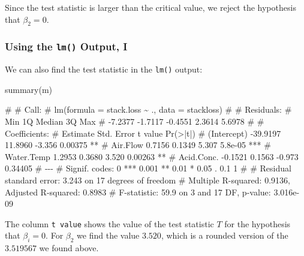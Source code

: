 \documentclass[
  a4paper,
]{article}
\newenvironment{Shaded}{\begin{snugshade}}{\end{snugshade}}
\newcommand{\FunctionTok}[1]{\textcolor[rgb]{0.00,0.00,0.00}{#1}}
\newcommand{\NormalTok}[1]{#1}
\theoremstyle{definition}
\theoremstyle{definition}
\theoremstyle{definition}
\theoremstyle{definition}
\theoremstyle{remark}
\begin{document}
Since the test statistic is larger than the critical value,
we reject the hypothesis that \(\beta_2 = 0\).

\hypertarget{using-the-lm-output-i}{%
\subsubsection{\texorpdfstring{Using the \texttt{lm()} Output, I}{Using the lm() Output, I}}\label{using-the-lm-output-i}}

We can also find the test statistic in the \texttt{lm()} output:

\begin{Shaded}
\begin{Highlighting}[]
\FunctionTok{summary}\NormalTok{(m)}
\end{Highlighting}
\end{Shaded}

\begin{Shaded}
\begin{Highlighting}[]
\NormalTok{\# }
\NormalTok{\# Call:}
\NormalTok{\# lm(formula = stack.loss \textasciitilde{} ., data = stackloss)}
\NormalTok{\# }
\NormalTok{\# Residuals:}
\NormalTok{\#     Min      1Q  Median      3Q     Max }
\NormalTok{\# {-}7.2377 {-}1.7117 {-}0.4551  2.3614  5.6978 }
\NormalTok{\# }
\NormalTok{\# Coefficients:}
\NormalTok{\#             Estimate Std. Error t value Pr(\textgreater{}|t|)    }
\NormalTok{\# (Intercept) {-}39.9197    11.8960  {-}3.356  0.00375 ** }
\NormalTok{\# Air.Flow      0.7156     0.1349   5.307  5.8e{-}05 ***}
\NormalTok{\# Water.Temp    1.2953     0.3680   3.520  0.00263 ** }
\NormalTok{\# Acid.Conc.   {-}0.1521     0.1563  {-}0.973  0.34405    }
\NormalTok{\# {-}{-}{-}}
\NormalTok{\# Signif. codes:  0 \textquotesingle{}***\textquotesingle{} 0.001 \textquotesingle{}**\textquotesingle{} 0.01 \textquotesingle{}*\textquotesingle{} 0.05 \textquotesingle{}.\textquotesingle{} 0.1 \textquotesingle{} \textquotesingle{} 1}
\NormalTok{\# }
\NormalTok{\# Residual standard error: 3.243 on 17 degrees of freedom}
\NormalTok{\# Multiple R{-}squared:  0.9136,  Adjusted R{-}squared:  0.8983 }
\NormalTok{\# F{-}statistic:  59.9 on 3 and 17 DF,  p{-}value: 3.016e{-}09}
\end{Highlighting}
\end{Shaded}

The column \texttt{t\ value} shows the value of the test statistic \(T\) for
the hypothesis that \(\beta_i = 0\). For \(\beta_2\) we find the value \(3.520\),
which is a rounded version of the \(3.519567\) we found above.
\end{document}
